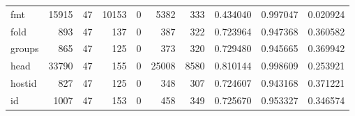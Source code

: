 \begin{longtable}{lrrrrrrrrr}
fmt       &                               15915 &                                              47 &                                          10153 &                                             0 &                                           5382 &                                          333 &                                           0.434040 &                               0.997047 &                             0.020924 \\
fold      &                                 893 &                                              47 &                                            137 &                                             0 &                                            387 &                                          322 &                                           0.723964 &                               0.947368 &                             0.360582 \\
groups    &                                 865 &                                              47 &                                            125 &                                             0 &                                            373 &                                          320 &                                           0.729480 &                               0.945665 &                             0.369942 \\
head      &                               33790 &                                              47 &                                            155 &                                             0 &                                          25008 &                                         8580 &                                           0.810144 &                               0.998609 &                             0.253921 \\
hostid    &                                 827 &                                              47 &                                            125 &                                             0 &                                            348 &                                          307 &                                           0.724607 &                               0.943168 &                             0.371221 \\
id        &                                1007 &                                              47 &                                            153 &                                             0 &                                            458 &                                          349 &                                           0.725670 &                               0.953327 &                             0.346574 \\

\end{longtable}
